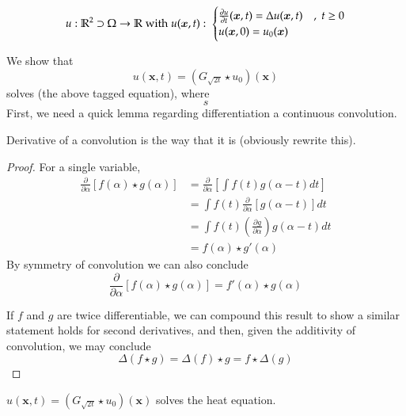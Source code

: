     \begin{equation}
    u: \mathbb{R}^2 \supset \Omega \to \mathbb{R} \; \textrm{with} \; u(\bm{x},t) : \;
    \begin{cases}
    \frac{\partial u}{\partial t} (\bm{x}, t) = \Delta u(\bm{x},t) & ,\; t \ge 0 \\
    u(\bm{x},0) = u_0(\bm{x}) 
    \end{cases}
    \end{equation}
    
    We show that
    \begin{equation}
    u(\bm{x},t) = \left(G_{\sqrt{2t}} \star u_0 \right)(\bm{x})
    \end{equation}
    solves (the above tagged equation), where
    \[
    s
    \]
    First, we need a quick lemma regarding differentiation a continuous convolution.
    \begin{lemma} \label{dconvolution}
    	Derivative of a convolution is the way that it is (obviously rewrite this).
    \end{lemma}
    \begin{proof}
    	For a single variable,
    	\begin{align}
    	\frac{\partial}{\partial \alpha} \left[ f(\alpha) \star g(\alpha) \right]
    	&= \frac{\partial}{\partial \alpha} \left[ 
    	\int f(t) g(\alpha - t) dt \right] \\
    	&=  \int f(t) \frac{\partial}{\partial \alpha}\left[ g(\alpha - t)  \right] dt \\
    	&=  \int f(t) \left(\frac{\partial g}{\partial \alpha}\right) g(\alpha - t) dt \\
    	&=  f(\alpha) \star g'(\alpha)
    	\end{align}
    	By symmetry of convolution we can also conclude 
    	\[\frac{\partial}{\partial \alpha} \left[ f(\alpha) \star g(\alpha) \right]
    	= f'(\alpha) \star g(\alpha)
    	\]
    	
    	If $f$ and $g$ are twice differentiable, we can compound this result to show a similar statement holds for second derivatives, and then, given the additivity of convolution,
    	we may conclude
    	\begin{equation}
    	\Delta \left(f \star g \right) = \Delta(f) \star g = f \star \Delta(g) 
    	\end{equation} 
    \end{proof}
    \begin{theorem}
    	$u(\bm{x},t) = \left(G_{\sqrt{2t}} \star u_0 \right)(\bm{x})$ solves the heat equation.
    \end{theorem}
